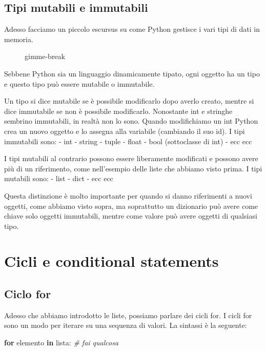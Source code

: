 \documentclass[11pt]{article}
\newenvironment{Shaded}{}{}
\newcommand{\KeywordTok}[1]{\textcolor[rgb]{0.00,0.44,0.13}{\textbf{{#1}}}}
\newcommand{\CommentTok}[1]{\textcolor[rgb]{0.38,0.63,0.69}{\textit{{#1}}}}
\newcommand{\NormalTok}[1]{{#1}}
\newcommand{\ControlFlowTok}[1]{\textcolor[rgb]{0.00,0.44,0.13}{\textbf{{#1}}}}
\begin{document}
\subsection{Tipi mutabili e
    immutabili}\label{tipi-mutabili-e-immutabili}

Adesso facciamo un piccolo escursus su come Python gestisce i vari tipi
di dati in memoria.

\begin{figure}
    \centering
    \caption{gimme-break}
\end{figure}

Sebbene Python sia un linguaggio dinamicamente tipato, ogni oggetto ha
un tipo e questo tipo può essere mutabile o immutabile.

Un tipo si dice mutabile se è possibile modificarlo dopo averlo creato,
mentre si dice immutabile se non è possibile modificarlo. Nonostante int
e stringhe sembrino immutabili, in realtà non lo sono. Quando
modifichiamo un int Python crea un nuovo oggetto e lo assegna alla
variabile (cambiando il suo id). I tipi immutabili sono: - int - string
- tuple - float - bool (sottoclasse di int) - ecc ecc

I tipi mutabili al contrario possono essere liberamente modificati e
possono avere più di un riferimento, come nell'esempio delle liste che
abbiamo visto prima. I tipi mutabili sono: - list - dict - ecc ecc

Questa distinzione è molto importante per quando si danno riferimenti a
nuovi oggetti, come abbiamo visto sopra, ma soprattutto un dizionario
può avere come chiave solo oggetti immutabili, mentre come valore può
avere oggetti di qualsiasi tipo.

\section{Cicli e conditional
  statements}\label{cicli-e-conditional-statements}

\subsection{Ciclo for}\label{ciclo-for}

Adesso che abbiamo introdotto le liste, possiamo parlare dei cicli for.
I cicli for sono un modo per iterare su una sequenza di valori. La
sintassi è la seguente:

\begin{Shaded}
    \begin{Highlighting}[]
        \ControlFlowTok{for}\NormalTok{ elemento }\KeywordTok{in}\NormalTok{ lista:}
        \CommentTok{\# fai qualcosa}
    \end{Highlighting}
\end{Shaded}
\end{document}
